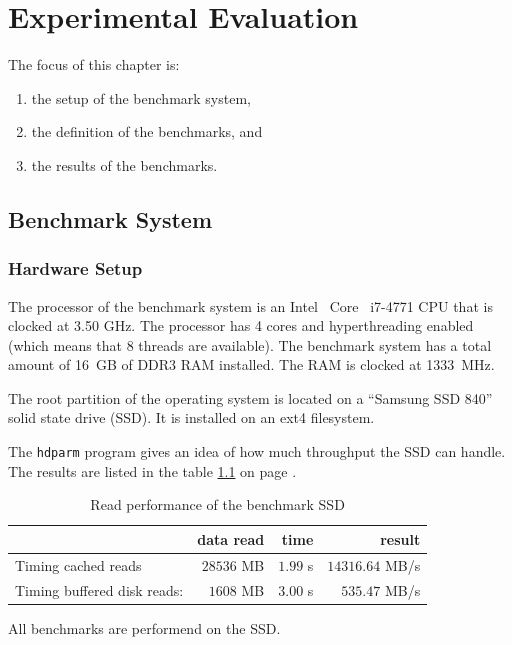 \chapter{Experimental Evaluation}

The focus of this chapter is:
\begin{enumerate}
\item the setup of the benchmark system,
\item the definition of the benchmarks, and
\item the results of the benchmarks.
\end{enumerate}

\section{Benchmark System}
  \subsection{Hardware Setup}

The processor of the benchmark system is an Intel\textregistered~ Core\texttrademark~ i7-4771 CPU that is clocked at 3.50 GHz.
The processor has 4 cores and hyperthreading enabled (which means that 8 threads are available).
The benchmark system has a total amount of \mbox{16 GB} of DDR3 RAM installed.
The RAM is clocked at \mbox{1333 MHz}.

The root partition of the operating system is located on a ``Samsung SSD 840'' solid state drive (SSD).
It is installed on an ext4 filesystem.

The \texttt{hdparm} program gives an idea of how much throughput the SSD can handle. The results are listed in the table \ref{eval-ssd} on page \pageref{eval-ssd}.

\begin{table}[h]
\centering
\caption{Read performance of the benchmark SSD}
\label{eval-ssd}
\begin{tabular}{lrrr}
\textbf{}                   & \textbf{data read} & \textbf{time} & \textbf{result} \\ \hline
Timing cached reads         & $28536$ MB         & $1.99$ s      & $14316.64$ MB/s \\
Timing buffered disk reads: & $1608$ MB          & $3.00$ s      & $535.47$ MB/s   \\ \hline
\end{tabular}
\end{table}

All benchmarks are performend on the SSD.

